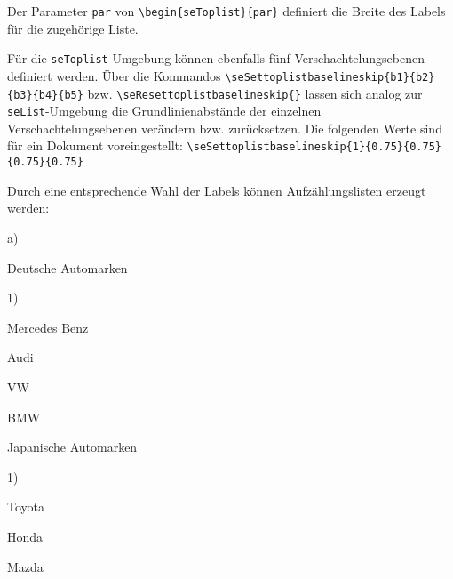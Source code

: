 \vspace*{-\baselineskip}
Der Parameter \verb+par+ von \verb+\begin{seToplist}{par}+ definiert die Breite des Labels f\"ur die 
zugeh\"orige Liste.

F\"ur die \verb+seToplist+-Umgebung k\"onnen ebenfalls f\"unf Verschachtelungsebenen definiert werden. 
\"Uber die Kommandos \newline
\hspace*{\fill}\verb+\seSettoplistbaselineskip{b1}{b2}{b3}{b4}{b5}+\hspace*{\fill}\newline 
bzw. \newline
\hspace*{\fill}\verb+\seResettoplistbaselineskip{}+\hspace*{\fill}\newline
lassen sich analog zur \verb+seList+-Umgebung die Grundlinienabst\"ande der einzelnen Verschachtelungsebenen 
ver\"andern bzw. zur\"ucksetzen. Die folgenden Werte sind f\"ur ein Dokument voreingestellt:\newline
\hspace*{\fill}\verb+\seSettoplistbaselineskip{1}{0.75}{0.75}{0.75}{0.75}+\hspace*{\fill}\newline\vspace*{-\baselineskip}

Durch eine entsprechende Wahl der Labels k\"onnen Aufz\"ahlungslisten erzeugt werden:

\begin{seToplist}{a)}
\item[a)] Deutsche Automarken
\begin{seToplist}{1)}
\item[1)] Mercedes Benz
\item[2)] Audi 
\item[3)] VW
\item[4)] BMW 
\end{seToplist}
\item[b)] Japanische Automarken
\begin{seToplist}{1)}
\item[1)] Toyota
\item[2)] Honda
\item[3)] Mazda
\end{seToplist}
\end{seToplist}

